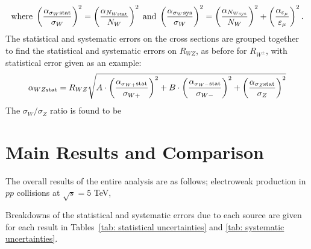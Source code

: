 \documentclass[a4paper,12pt]{article}
\begin{document}
\begin{equation}
    {\rm where \;} \left(\frac{\alpha_{\sigma_{W}\rm stat}}{\sigma_{W}}\right)^2 = \left(\frac{\alpha_{N_{W \rm stat}}}{N_{W}}\right)^2 {\rm \; and \;} \left(\frac{\alpha_{\sigma_{W} \rm sys}}{\sigma_{W}}\right)^2 = \left(\frac{\alpha_{N_{W \rm sys}}}{N_{W}}\right)^2 + \left(\frac{\alpha_{\varepsilon_{\mu}}}{\varepsilon_{\mu}}\right)^2.
\end{equation}
The statistical and systematic errors on the cross sections are grouped together to find the statistical and systematic errors on $R_{WZ}$, as before for $R_{W^\pm}$, with statistical error given as an example:
\begin{equation}
    \alpha_{WZ \rm stat} = R_{WZ}\sqrt{A \cdot \left(\frac{\alpha_{\sigma_{W+} \rm stat}}{\sigma_{W+}}\right)^2 + B \cdot \left(\frac{\alpha_{\sigma_{W-}\rm stat}}{\sigma_{W-}}\right)^2 + \left(\frac{\alpha_{\sigma_{Z}\rm stat}}{\sigma_Z}\right)^2}
\end{equation}
The $\sigma_{W}/\sigma_{Z}$ ratio is found to be



%
%
%
%

\section{Main Results and Comparison} \label{sec: results}
The overall results of the entire analysis are as follows; electroweak production in $pp$ collisions at $\sqrt{s}=5$ TeV,






Breakdowns of the statistical and systematic errors due to each source are given for each result in Tables~\ref{tab: statistical uncertainties} and \ref{tab: systematic uncertainties}.



\end{document}
